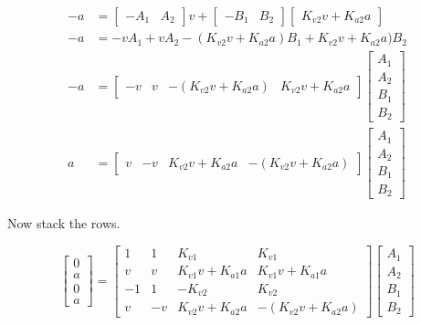\begin{align*}
  -a &=
    \begin{bmatrix}
      -A_1 & A_2
    \end{bmatrix} v +
    \begin{bmatrix}
      -B_1 & B_2
    \end{bmatrix}
    \begin{bmatrix}
      K_{v2} v + K_{a2} a
    \end{bmatrix} \\
  -a &= -v A_1 + v A_2 - (K_{v2} v + K_{a2} a) B_1 + K_{v2} v + K_{a2} a) B_2 \\
  -a &=
    \begin{bmatrix}
      -v & v & -(K_{v2} v + K_{a2} a) & K_{v2} v+ K_{a2} a
    \end{bmatrix}
    \begin{bmatrix}
      A_1 \\
      A_2 \\
      B_1 \\
      B_2
    \end{bmatrix} \\
  a &=
    \begin{bmatrix}
      v & -v & K_{v2} v + K_{a2} a & -(K_{v2} v + K_{a2} a)
    \end{bmatrix}
    \begin{bmatrix}
      A_1 \\
      A_2 \\
      B_1 \\
      B_2
    \end{bmatrix}
\end{align*}

Now stack the rows.

\begin{equation*}
  \begin{bmatrix}
    0 \\
    a \\
    0 \\
    a
  \end{bmatrix} =
  \begin{bmatrix}
    1 & 1 & K_{v1} & K_{v1} \\
    v & v & K_{v1} v + K_{a1} a & K_{v1} v + K_{a1} a \\
    -1 & 1 & -K_{v2} & K_{v2} \\
    v & -v & K_{v2} v + K_{a2} a & -(K_{v2} v + K_{a2} a)
  \end{bmatrix}
  \begin{bmatrix}
    A_1 \\
    A_2 \\
    B_1 \\
    B_2
  \end{bmatrix}
\end{equation*}

